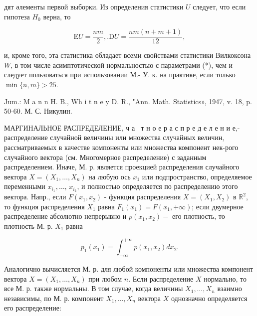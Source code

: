 \documentclass[10pt]{article}
\begin{document}
дят әлементы первой выборки. Из определения статистики $U$ следует, что если гипотеза $H_{0}$ верна, то



\[

\mathrm{E} U=\frac{n m}{2}, . \mathrm{D} U=\frac{n m(n+m+1)}{12},

\]



и, кроме того, эта статистика обладает всеми свойствами статистики Вилкоксона $W$, в том числе асимптотической нормальностью с параметрами (*), чем и следует пользоваться при использовании М.- У. к. на практике, если только $\min \{n, m\}>25$.



Jum.: M a n n H. B., Wh i t n e y D. R., "Ann. Math. Statistics», 1947, v. 18, p. 50-60. М. С. Никулин.



МАРГИНАЛЬНОЕ РАСПРЕДЕЛЕНИЕ, ч а $~$ т н о е р а с п р е д е л е н и е,- распределение случайной величины или множества случайных величин, рассматриваемых в качестве компоненты или множества компонент нек-рого случайного вектора (см. Многомерное распределение) с заданным распределением. Иначе, М. р. является проекцией распределения случайного вектора $X=\left(X_{1}, \ldots, X_{n}\right)$ на любую ось $x_{1}$ или подпространство, определяемое переменными $x_{i_{1}}, \ldots$, $x_{i_{k}}$, и полностью определяется по распределению этого вектора. Напр., если $F\left(x_{1}, x_{2}\right)$ - функция распределения $X=\left(X_{1}, X_{2}\right)$ в $\mathbb{R}^{2}$, то функция распределения $X_{1}$ равна $F_{1}\left(x_{1}\right)=F\left(x_{1},+\infty\right)$; если двумерное распределение абсолютно непрерывно и $p\left(x_{1}, x_{2}\right)-$ его плотность, то плотность М. р. $X_{1}$ равна



\[

p_{1}\left(x_{1}\right)=\int_{-\infty}^{+\infty} p\left(x_{1}, x_{2}\right) d x_{2} .

\]



Аналогично вычисляется М. р. для любой компоненты или множества компонент вектора $X=\left(X_{1}, \ldots, X_{n}\right)$ при любом $n$. Если распределение $X$ нормально, то все М. р. также нормальны. В том случае, когда величины $X_{1}, \ldots, X_{n}$ взаимно независимы, по М. р. компонент $X_{1}, \ldots, X_{n}$ вектора $X$ однозначно определяется его распределение:
\end{document}
